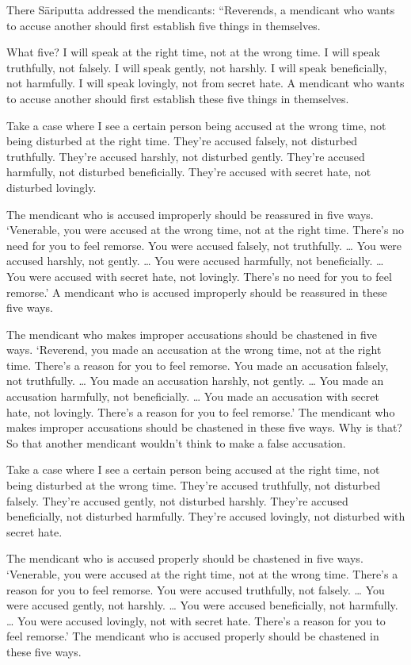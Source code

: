 \documentclass[12pt,openany]{book}%
\begin{document}
There \textsanskrit{Sāriputta} addressed the mendicants: “Reverends, a mendicant who wants to accuse another should first establish five things in themselves. 

What five? I will speak at the right time, not at the wrong time. I will speak truthfully, not falsely. I will speak gently, not harshly. I will speak beneficially, not harmfully. I will speak lovingly, not from secret hate. A mendicant who wants to accuse another should first establish these five things in themselves. 

Take a case where I see a certain person being accused at the wrong time, not being disturbed at the right time. They’re accused falsely, not disturbed truthfully. They’re accused harshly, not disturbed gently. They’re accused harmfully, not disturbed beneficially. They’re accused with secret hate, not disturbed lovingly. 

The mendicant who is accused improperly should be reassured in five ways. ‘Venerable, you were accused at the wrong time, not at the right time. There’s no need for you to feel remorse. You were accused falsely, not truthfully. … You were accused harshly, not gently. … You were accused harmfully, not beneficially. … You were accused with secret hate, not lovingly. There’s no need for you to feel remorse.’ A mendicant who is accused improperly should be reassured in these five ways. 

The mendicant who makes improper accusations should be chastened in five ways. ‘Reverend, you made an accusation at the wrong time, not at the right time. There’s a reason for you to feel remorse. You made an accusation falsely, not truthfully. … You made an accusation harshly, not gently. … You made an accusation harmfully, not beneficially. … You made an accusation with secret hate, not lovingly. There’s a reason for you to feel remorse.’ The mendicant who makes improper accusations should be chastened in these five ways. Why is that? So that another mendicant wouldn’t think to make a false accusation. 

Take a case where I see a certain person being accused at the right time, not being disturbed at the wrong time. They’re accused truthfully, not disturbed falsely. They’re accused gently, not disturbed harshly. They’re accused beneficially, not disturbed harmfully. They’re accused lovingly, not disturbed with secret hate. 

The mendicant who is accused properly should be chastened in five ways. ‘Venerable, you were accused at the right time, not at the wrong time. There’s a reason for you to feel remorse. You were accused truthfully, not falsely. … You were accused gently, not harshly. … You were accused beneficially, not harmfully. … You were accused lovingly, not with secret hate. There’s a reason for you to feel remorse.’ The mendicant who is accused properly should be chastened in these five ways. 
\end{document}
